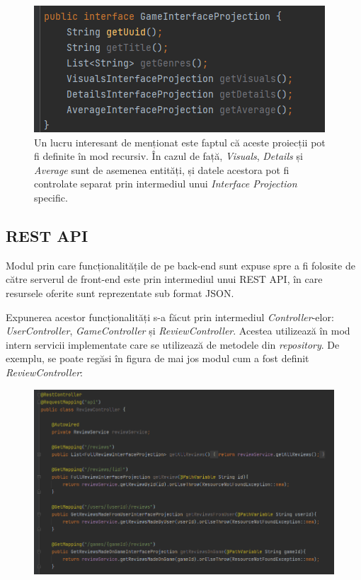 \documentclass[12pt,a4paper]{report}
\begin{document}
\begin{figure}[H]
\centering
\caption{}
\includegraphics[scale = 1]{exemplu_20_interface_projection}
\caption*{Un lucru interesant de menționat este faptul că aceste proiecții pot fi definite în mod recursiv. În cazul de față, \emph{Visuals}, \emph{Details} și \emph{Average} sunt de asemenea entități, și datele acestora pot fi controlate separat prin intermediul unui \emph{Interface Projection} specific.}
\end{figure}


\subsection{REST API}

Modul prin care funcționalitățile de pe back-end sunt expuse spre a fi folosite de către serverul de front-end este prin intermediul unui REST API, în care resursele oferite sunt reprezentate sub format JSON.

Expunerea acestor funcționalități s-a făcut prin intermediul \emph{Controller}-elor: \emph{UserController}, \emph{GameController} și \emph{ReviewController}. Acestea utilizează în mod intern servicii implementate care se utilizează de metodele din \emph{repository}. De exemplu, se poate regăsi în figura de mai jos modul cum a fost definit \emph{ReviewController}:

\begin{figure}[H]
\centering
\caption{}
\begin{adjustbox}{max size={\textwidth}{\textheight}}
\includegraphics[scale = 0.7]{exemplu_21_review_controller}
\end{adjustbox}
\caption*{}
\end{figure}
\end{document}

